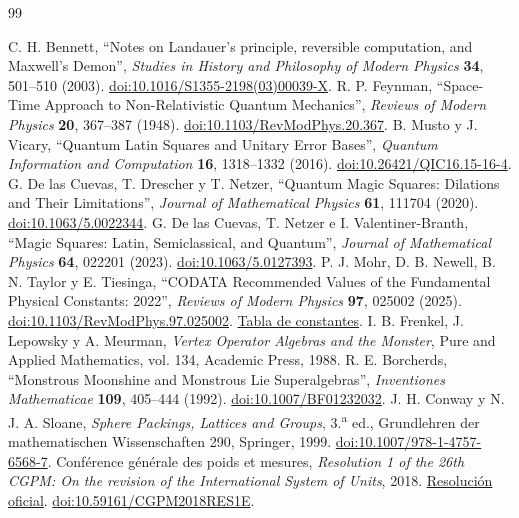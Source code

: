 \begin{thebibliography}{99}
{}
 C. H. Bennett, ``Notes on Landauer's principle,
reversible computation, and Maxwell's Demon'', \emph{Studies in History
and Philosophy of Modern Physics} \textbf{34}, 501--510 (2003).
\href{https://doi.org/10.1016/S1355-2198(03)00039-X}{doi:10.1016/S1355-2198(03)00039-X}.
 R. P. Feynman, ``Space-Time Approach to Non-Relativistic Quantum Mechanics'', \emph{Reviews of Modern Physics} \textbf{20}, 367--387 (1948). \href{https://doi.org/10.1103/RevModPhys.20.367}{doi:10.1103/RevModPhys.20.367}.
 B. Musto y J. Vicary, ``Quantum Latin Squares and Unitary Error Bases'', \emph{Quantum Information and Computation} \textbf{16}, 1318--1332 (2016). \href{https://doi.org/10.26421/QIC16.15-16-4}{doi:10.26421/QIC16.15-16-4}.
 G. De las Cuevas, T. Drescher y T. Netzer, ``Quantum Magic Squares: Dilations and Their Limitations'', \emph{Journal of Mathematical Physics} \textbf{61}, 111704 (2020). \href{https://doi.org/10.1063/5.0022344}{doi:10.1063/5.0022344}.
 G. De las Cuevas, T. Netzer e I. Valentiner-Branth, ``Magic Squares: Latin, Semiclassical, and Quantum'', \emph{Journal of Mathematical Physics} \textbf{64}, 022201 (2023). \href{https://doi.org/10.1063/5.0127393}{doi:10.1063/5.0127393}.
 P. J. Mohr, D. B. Newell, B. N. Taylor y E. Tiesinga, ``CODATA Recommended Values of the Fundamental Physical Constants: 2022'', \emph{Reviews of Modern Physics} \textbf{97}, 025002 (2025). \href{https://doi.org/10.1103/RevModPhys.97.025002}{doi:10.1103/RevModPhys.97.025002}. \href{https://physics.nist.gov/cuu/Constants/Table/allascii.txt}{Tabla de constantes}.
 I. B. Frenkel, J. Lepowsky y A. Meurman, \emph{Vertex Operator Algebras and the Monster}, Pure and Applied Mathematics, vol. 134, Academic Press, 1988.
 R. E. Borcherds, ``Monstrous Moonshine and Monstrous Lie Superalgebras'', \emph{Inventiones Mathematicae} \textbf{109}, 405--444 (1992). \href{https://doi.org/10.1007/BF01232032}{doi:10.1007/BF01232032}.
 J. H. Conway y N. J. A. Sloane, \emph{Sphere Packings, Lattices and Groups}, 3.\textsuperscript{a} ed., Grundlehren der mathematischen Wissenschaften 290, Springer, 1999. \href{https://doi.org/10.1007/978-1-4757-6568-7}{doi:10.1007/978-1-4757-6568-7}.
 Conférence générale des poids et mesures, \emph{Resolution 1 of the 26th CGPM: On the revision of the International System of Units}, 2018. \href{https://www.bipm.org/en/committees/cg/cgpm/26-2018/resolution-1}{Resolución oficial}. \href{https://doi.org/10.59161/CGPM2018RES1E}{doi:10.59161/CGPM2018RES1E}.

\end{thebibliography}
